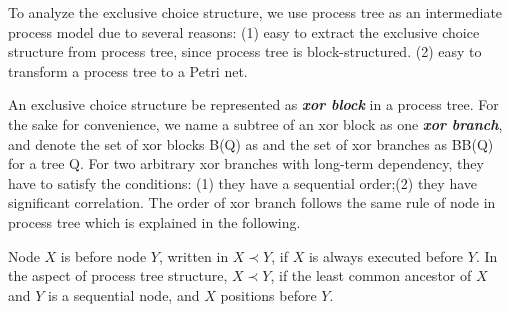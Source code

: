 To analyze the exclusive choice structure, we use process tree as an intermediate process model due to several reasons: (1) easy to extract the exclusive choice structure from process tree, since process tree is block-structured. (2) easy to transform a process tree to a Petri net. 

An exclusive choice structure be represented as \textbf{\emph{xor block}} in a process tree. For the sake for convenience, we name a subtree of an xor block as one \textbf{\emph{xor branch}}, and denote the set of xor blocks B(Q) as and the set of xor branches as BB(Q) for a tree Q.
For two arbitrary xor branches with long-term dependency, they have to satisfy the conditions: (1) they have a sequential order;(2) they have significant correlation.
The order of xor branch follows the same rule of node in process tree which is explained in the following.
\begin{definition}
	Node $X$ is before node $Y$, written in $X \prec Y$, if $X$ is always executed before $Y$.  In the aspect of process tree structure, $X \prec Y$, if the least common ancestor of $X$ and $Y$ is a sequential node, and $X$ positions before $Y$.
\end{definition} 


